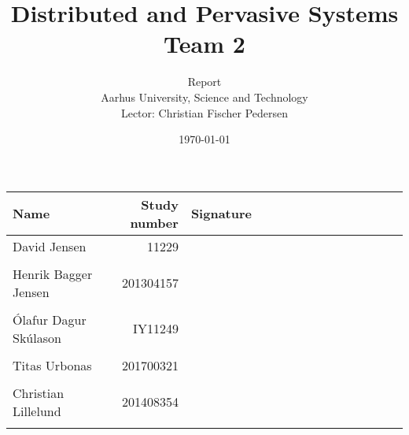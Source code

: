 \documentclass[a4paper,10pt,oneside]{memoir}
\title{Distributed and Pervasive Systems \\ Team 2}
\author{Report \\ Aarhus University, Science and Technology \\ Lector: Christian Fischer Pedersen}
\date{\today}
\begin{document}
\fancyhf{} %
\frontmatter
\maketitle
\vfill


\begin{table} [h]
	\centering
	\begin{tabular}{|l|r|l|}
	\hline 
	\textbf{Name} 				& \textbf{Study number} & \textbf{Signature~~~~~~~~~~~~~~~~~~~~} 	\\ \hline
	David Jensen 				& 11229 	& \\ && 												\\ \hline
	Henrik Bagger Jensen 		& 201304157 & \\ && 												\\ \hline
	Ólafur Dagur Skúlason 		& IY11249	& \\ && 												\\ \hline
	Titas Urbonas 				& 201700321 & \\ && 												\\ \hline
	Christian Lillelund 		& 201408354 & \\ && 												\\ \hline

	\end{tabular}
\end{table}

\clearpage
\pagestyle{plain}

\tableofcontents

\vfill

\mainmatter
\pagestyle{fancy}
\fancyhf{} %
\fancyhead[CE,CO]{\nouppercase{\leftmark}}
\fancyfoot[CO,CE]{\nouppercase{\rightmark}}
\fancyfoot[LE,RO]{\thepage}

				\clearpage
	\clearpage
		\clearpage
		\clearpage
					\clearpage
				\clearpage
			\clearpage
			\clearpage
				\clearpage
				    \clearpage
				    \clearpage
				\clearpage
				\clearpage

\end{document}
